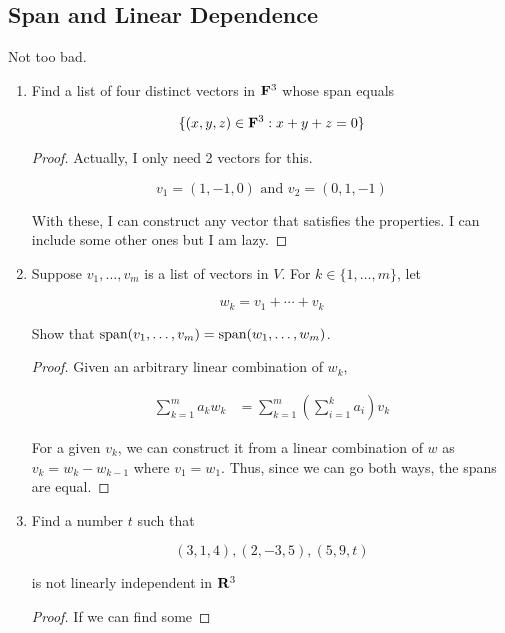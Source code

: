 \subsection{Span and Linear Dependence}

Not too bad.

\begin{enumerate}
    \item[1] Find a list of four distinct vectors in $\bold F^3$ whose span equals 
    
    \[\{(x, y, z) \in \bold F^3: x + y + z = 0\}\]

    \begin{proof}
        Actually, I only need 2 vectors for this.

        \[v_1 = (1, -1, 0) \text{   and   } v_2 = (0, 1, -1)\]

        With these, I can construct any vector that satisfies the properties. I can include some other ones but I am lazy.
        
    \end{proof}

    \item[3] Suppose $v_1, \dots, v_m$ is a list of vectors in $V$. For $k \in \{1, \dots, m\}$, let 
    
    \[w_k = v_1 + \cdots + v_k\]

    Show that $\text{span}(v_1, \dots, v_m) = \text{span}(w_1, \dots, w_m)$.

    \begin{proof}
        Given an arbitrary linear combination of $w_k$, 

        \begin{align*}
            \sum_{k = 1}^m a_k w_k &= \sum_{k = 1}^m(\sum_{i = 1}^{k} a_i) v_k
        \end{align*}

        For a given $v_k$, we can construct it from a linear combination of $w$ as $v_k = w_k - w_{k-1}$ where $v_1 = w_1$. Thus, since we can go both ways, the spans are equal.

    \end{proof}

    \item[5] Find a number $t$ such that 
    
    \[(3, 1, 4), (2, -3, 5), (5, 9, t)\]

    is not linearly independent in $\bold R^3$

    \begin{proof}
        If we can find some 


\end{proof}
\end{enumerate}
